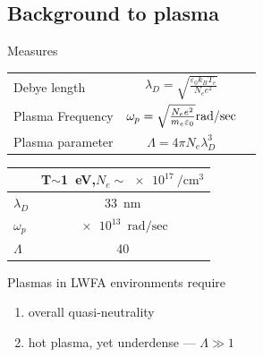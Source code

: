 \documentclass[]{beamer}
\begin{document}
  \subsection{Background to plasma}
  \begin{frame}{Measures}
    \begin{tabular}{l c r}
     Debye length & $\lambda_D=\sqrt{\frac{\varepsilon_0 k_B T_e}{N_e e^2}}$ &  \\ 
     Plasma Frequency & $ \omega_p=\sqrt{\frac{N_e e^2}{m_e \varepsilon_0}}\si[per-mode=fraction]{\radian\per\sec} $ &   \\
     Plasma parameter & $ \Lambda=4\pi N_e \lambda_D ^3 $ &  \\
    \end{tabular}
  \end{frame}
  \begin{frame}{}
      \begin{table}[]
    \begin{tabular}{l | c}
      & T$\sim$\SI{1}{\electronvolt},$N_e\sim\SI{e17}{\per\cubic\cm}$ \\ \hline 
      $\lambda_D$     & \SI{33}{\nm}     \\
      $\omega_p$      & $\SI[per-mode=fraction]{e13}{\radian\per\sec}$   \\
      $\Lambda$ & 40
    \end{tabular}
      \end{table}
  Plasmas in LWFA environments require
    \begin{enumerate}
      \item[\textbullet] overall quasi-neutrality
      \item[\textbullet] hot plasma, yet underdense --- $\Lambda \gg 1$
    \end{enumerate}
  \end{frame}
\end{document}
